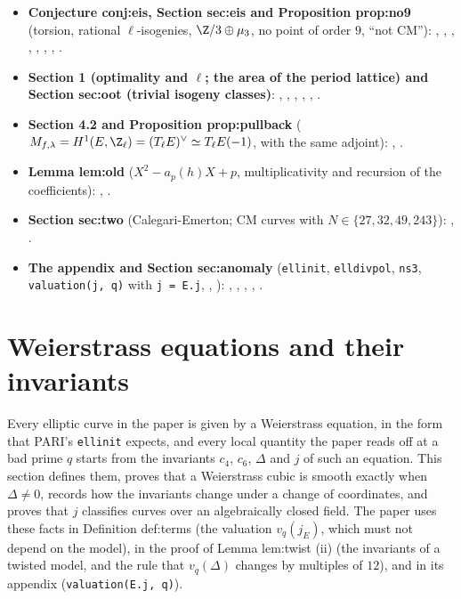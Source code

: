 \begin{itemize}
, .
\item \textbf{Conjecture conj:eis, Section sec:eis and Proposition prop:no9} (torsion, rational $\ell$-isogenies, $\Z/3\oplus\mu_3$, no point of order $9$, ``not CM''): ,
, , , , , , .
\item \textbf{Section 1 (optimality and $\ell$; the area of the period lattice) and Section sec:oot (trivial isogeny classes)}: , ,
, , , .
\item \textbf{Section 4.2 and Proposition prop:pullback} ($M_{f,\lambda}=H^1(E,\Z_\ell)=(T_\ell E)^\vee\simeq T_\ell E(-1)$, with the same adjoint): ,
.
\item \textbf{Lemma lem:old} ($X^2-a_p(h)X+p$, multiplicativity and recursion of the coefficients): , .
\item \textbf{Section sec:two} (Calegari-Emerton; CM curves with $N\in\{27,32,49,243\}$): , .
\item \textbf{The appendix and Section sec:anomaly} (\texttt{ellinit}, \texttt{elldivpol}, \texttt{ns3}, \texttt{valuation(j, q)} with \texttt{j = E.j}, , ): ,
, , , .
\end{itemize}

\section{Weierstrass equations and their invariants}\label{sec:ellcurves:weierstrass}

Every elliptic curve in the paper is given by a Weierstrass equation, in the form that PARI's \texttt{ellinit} expects, and
every local quantity the paper reads off at a bad prime $q$ starts from the invariants $c_4$, $c_6$, $\Delta$ and $j$ of such an
equation. This section defines them, proves that a Weierstrass cubic is smooth exactly when $\Delta\ne0$, records how the
invariants change under a change of coordinates, and proves that $j$ classifies curves over an algebraically closed field.
The paper uses these facts in Definition def:terms (the valuation $v_q(j_E)$, which must not depend on the model), in the proof of
Lemma lem:twist (ii) (the invariants of a twisted model, and the rule that $v_q(\Delta)$ changes by multiples of $12$), and in its
appendix (\texttt{valuation(E.j, q)}).


